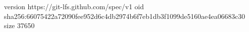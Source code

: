 version https://git-lfs.github.com/spec/v1
oid sha256:66075422a72090fee952d6c4db2974b6f7eb1db3f1099de5160ae4ea06683c30
size 37650
